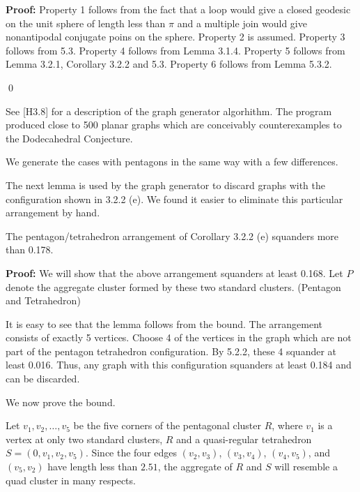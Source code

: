 \bigskip

{\bf Proof:} Property 1 follows from the fact that a loop would give a closed geodesic on the unit sphere of length less than $\pi$ and a multiple join would give nonantipodal conjugate poins on the sphere. \newline 
Property 2 is assumed.  \newline
Property 3 follows from 5.3. \newline 
Property 4 follows from Lemma 3.1.4. \newline 
Property 5 follows from Lemma 3.2.1, Corollary 3.2.2 and 5.3.\newline 
Property 6 follows from Lemma 5.3.2. \newline 

\qed


See [H3.8] for a description of the graph generator algorhithm.  The program produced close to 500 planar graphs which are conceivably counterexamples to the Dodecahedral Conjecture.

We generate the cases with pentagons in the same way with a few differences.

The next lemma is used by the graph generator to discard graphs with 
the configuration shown in 3.2.2 (e).  We found it easier to eliminate this
particular arrangement by hand.

 The  pentagon/tetrahedron arrangement of Corollary 3.2.2 (e) squanders more than 0.178. \endproclaim

{\bf Proof:} We will show that the above arrangement squanders at least
0.168.  Let $P$ denote the aggregate cluster formed by these two standard
clusters. (Pentagon and Tetrahedron)

It is easy to see that the lemma follows from the bound.  The arrangement consists of exactly 5 vertices.  Choose 4 of the vertices in the graph which are not part of the pentagon tetrahedron configuration.  By 5.2.2, these 4 squander at least 0.016.  Thus, any graph with this configuration squanders at least 0.184 and can be discarded.

We now prove the bound.  

Let $v_1,v_2,\ldots,v_5$
be the five corners of the pentagonal cluster $R$, where $v_1$ is a
vertex at only two standard clusters, $R$ and a quasi-regular tetrahedron
$S = (0,v_1,v_2,v_5)$.   Since the four edges $(v_2,v_3)$, $(v_3,v_4)$,
$(v_4,v_5)$, and $(v_5,v_2)$ have length less than $2.51$, the
aggregate of 
$R$ and $S$ will resemble a quad cluster in many respects.

